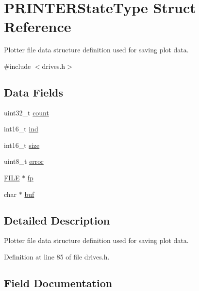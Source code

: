 \hypertarget{structPRINTERStateType}{}\section{P\+R\+I\+N\+T\+E\+R\+State\+Type Struct Reference}
\label{structPRINTERStateType}


Plotter file data structure definition used for saving plot data.  




{\ttfamily \#include $<$drives.\+h$>$}

\subsection*{Data Fields}
\begin{DoxyCompactItemize}
\item 
uint32\+\_\+t \hyperlink{structPRINTERStateType_ae115fc351910f3801e37b31f254fb8f4}{count}
\item 
int16\+\_\+t \hyperlink{structPRINTERStateType_a7d8873d0011f31d7dd00c2b7e0d362bd}{ind}
\item 
int16\+\_\+t \hyperlink{structPRINTERStateType_ac6d8323e47879ed58e7fa2cc7cfd7c30}{size}
\item 
uint8\+\_\+t \hyperlink{structPRINTERStateType_a6e5b550f5396901febd5475445132dd0}{error}
\item 
\hyperlink{posix_8h_aed4dabeb9f7c518ded42f930a04abce8}{F\+I\+LE} $\ast$ \hyperlink{structPRINTERStateType_a791c78d68d169f9d2e60d34b890e520a}{fp}
\item 
char $\ast$ \hyperlink{structPRINTERStateType_aa48220761aa3c77c954a55f09388c615}{buf}
\end{DoxyCompactItemize}


\subsection{Detailed Description}
Plotter file data structure definition used for saving plot data. 

Definition at line 85 of file drives.\+h.



\subsection{Field Documentation}
\mbox{\label{structPRINTERStateType_aa48220761aa3c77c954a55f09388c615}} 
